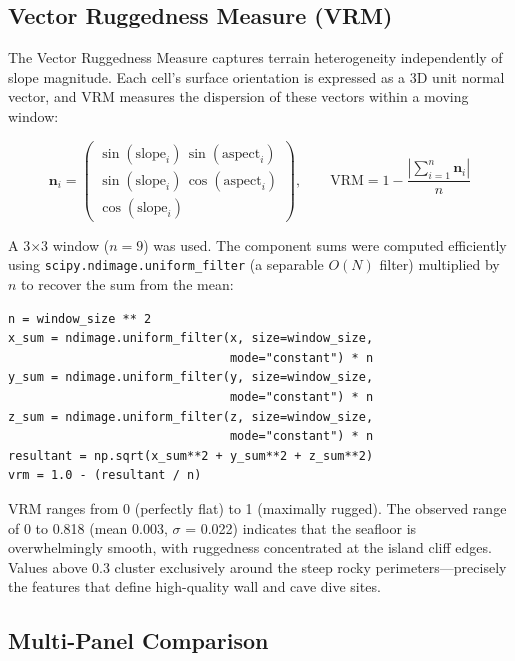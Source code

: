 \documentclass[a4paper,11pt]{article}
\begin{document}
\subsection{Vector Ruggedness Measure (VRM)}
\label{sec:vrm}

The Vector Ruggedness Measure \citep{sappington2007} captures terrain heterogeneity
independently of slope magnitude. Each cell's surface orientation is expressed as a 3D
unit normal vector, and VRM measures the dispersion of these vectors within a moving
window:

\begin{equation}
\mathbf{n}_i = \begin{pmatrix}
    \sin(\text{slope}_i)\,\sin(\text{aspect}_i) \\
    \sin(\text{slope}_i)\,\cos(\text{aspect}_i) \\
    \cos(\text{slope}_i)
\end{pmatrix},
\qquad
\text{VRM} = 1 - \frac{\left|\sum_{i=1}^{n} \mathbf{n}_i\right|}{n}
\label{eq:vrm}
\end{equation}

A 3$\times$3 window ($n = 9$) was used. The component sums were computed efficiently
using \texttt{scipy.ndimage.uniform\_filter} (a separable $O(N)$ filter) multiplied by
$n$ to recover the sum from the mean:

\begin{lstlisting}
n = window_size ** 2
x_sum = ndimage.uniform_filter(x, size=window_size,
                               mode="constant") * n
y_sum = ndimage.uniform_filter(y, size=window_size,
                               mode="constant") * n
z_sum = ndimage.uniform_filter(z, size=window_size,
                               mode="constant") * n
resultant = np.sqrt(x_sum**2 + y_sum**2 + z_sum**2)
vrm = 1.0 - (resultant / n)
\end{lstlisting}

VRM ranges from 0 (perfectly flat) to 1 (maximally rugged). The observed range of 0 to
0.818 (mean 0.003, $\sigma$ = 0.022) indicates that the seafloor is overwhelmingly
smooth, with ruggedness concentrated at the island cliff edges. Values above 0.3 cluster
exclusively around the steep rocky perimeters---precisely the features that define
high-quality wall and cave dive sites.

\subsection{Multi-Panel Comparison}
\end{document}
